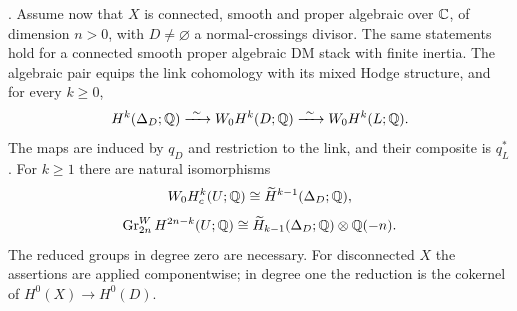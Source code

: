 \begin{theorem}
\label{P4c2}
. Assume now that $X$ is connected, smooth and proper algebraic over $\mathbb C$, of dimension $n>0$, with $D\ne\varnothing$ a normal-crossings divisor. The same statements hold for a connected smooth proper algebraic DM stack with finite inertia. The algebraic pair equips the link cohomology with its mixed Hodge structure, and for every $k\ge0$,
\[
 H^k(\Delta_D;\mathbb Q)
 \xrightarrow{\ \sim\ } W_0H^k(D;\mathbb Q)
 \xrightarrow{\ \sim\ } W_0H^k(L;\mathbb Q).
\]
The maps are induced by $q_D$ and restriction to the link, and their composite is $q_L^*$. For $k\ge1$ there are natural isomorphisms
\[
 W_0H_c^k(U;\mathbb Q)\cong\widetilde H^{k-1}(\Delta_D;\mathbb Q),
\]
\[
 \operatorname{Gr}_{2n}^{W}H^{2n-k}(U;\mathbb Q)
 \cong\widetilde H_{k-1}(\Delta_D;\mathbb Q)\otimes\mathbb Q(-n).
\]
The reduced groups in degree zero are necessary. For disconnected $X$ the assertions are applied componentwise; in degree one the reduction is the cokernel of $H^0(X)\to H^0(D)$.
\end{theorem}
